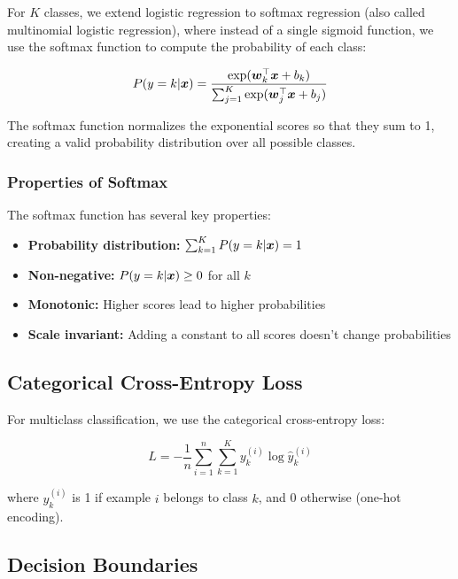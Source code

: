 For $K$ classes, we extend logistic regression to softmax regression (also called multinomial logistic regression), where instead of a single sigmoid function, we use the softmax function to compute the probability of each class:

\begin{equation}
P(y=k|\boldsymbol{x}) = \frac{\exp(\boldsymbol{w}_k^\top \boldsymbol{x} + b_k)}{\sum_{j=1}^{K} \exp(\boldsymbol{w}_j^\top \boldsymbol{x} + b_j)}
\end{equation}

The softmax function normalizes the exponential scores so that they sum to 1, creating a valid probability distribution over all possible classes.

\subsubsection{Properties of Softmax}

The softmax function has several key properties:
\begin{itemize}
    \item \textbf{Probability distribution:} $\sum_{k=1}^{K} P(y=k|\boldsymbol{x}) = 1$
    \item \textbf{Non-negative:} $P(y=k|\boldsymbol{x}) \geq 0$ for all $k$
    \item \textbf{Monotonic:} Higher scores lead to higher probabilities
    \item \textbf{Scale invariant:} Adding a constant to all scores doesn't change probabilities
\end{itemize}

\subsection{Categorical Cross-Entropy Loss}

For multiclass classification, we use the categorical cross-entropy loss:

\begin{equation}
L = -\frac{1}{n} \sum_{i=1}^{n} \sum_{k=1}^{K} y_k^{(i)} \log \hat{y}_k^{(i)}
\end{equation}

where $y_k^{(i)}$ is 1 if example $i$ belongs to class $k$, and 0 otherwise (one-hot encoding).

\subsection{Decision Boundaries}

